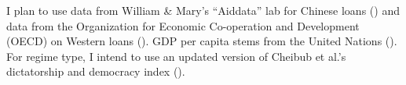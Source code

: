 \documentclass[12pt]{article}
\begin{document}
I plan to use data from William \& Mary's ``Aiddata'' lab for Chinese loans (\cite{custer2021}) and data from the Organization for Economic Co-operation and Development (OECD) on Western loans (\cite{organizationforeconomicco-operationanddevelopment2022a}). GDP per capita stems from the United Nations (\cite{unitednationsstatisticsdivision2019}). For regime type, I intend to use an updated version of Cheibub et al.'s dictatorship and democracy index (\cite{cheibub2010}).

\nocite{curini2020}
\pagebreak
\printbibliography
\end{document}
